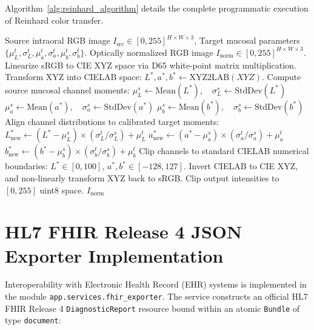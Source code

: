 \documentclass[12pt,a4paper,oneside]{report}
\begin{document}
Algorithm~\ref{alg:reinhard_algorithm} details the complete programmatic execution of Reinhard color transfer.

\begin{algorithm}[H]
\caption{Reinhard CIELAB Oral Mucosal Color Normalization}
\label{alg:reinhard_algorithm}
\begin{algorithmic}[1]
\Require Source intraoral RGB image $I_{\text{src}} \in [0, 255]^{H \times W \times 3}$, Target mucosal parameters $\{\mu_L^t, \sigma_L^t, \mu_a^t, \sigma_a^t, \mu_b^t, \sigma_b^t\}$.
\Ensure Optically normalized RGB image $I_{\text{norm}} \in [0, 255]^{H \times W \times 3}$.
\State Linearize sRGB to CIE XYZ space via D65 white-point matrix multiplication.
\State Transform XYZ into CIELAB space: $L^*, a^*, b^* \gets \text{XYZ2LAB}(XYZ)$.
\State Compute source mucosal channel moments:
    \State $\mu_L^s \gets \text{Mean}(L^*), \quad \sigma_L^s \gets \text{StdDev}(L^*)$
    \State $\mu_a^s \gets \text{Mean}(a^*), \quad \sigma_a^s \gets \text{StdDev}(a^*)$
    \State $\mu_b^s \gets \text{Mean}(b^*), \quad \sigma_b^s \gets \text{StdDev}(b^*)$
\State Align channel distributions to calibrated target moments:
    \State $L^*_{\text{new}} \gets (L^* - \mu_L^s) \times (\sigma_L^t / \sigma_L^s) + \mu_L^t$
    \State $a^*_{\text{new}} \gets (a^* - \mu_a^s) \times (\sigma_a^t / \sigma_a^s) + \mu_a^t$
    \State $b^*_{\text{new}} \gets (b^* - \mu_b^s) \times (\sigma_b^t / \sigma_b^s) + \mu_b^t$
\State Clip channels to standard CIELAB numerical boundaries: $L^* \in [0, 100]$, $a^*, b^* \in [-128, 127]$.
\State Invert CIELAB to CIE XYZ, and non-linearly transform XYZ back to sRGB.
\State Clip output intensities to $[0, 255]$ uint8 space.
\State \Return $I_{\text{norm}}$
\end{algorithmic}
\end{algorithm}

\section{HL7 FHIR Release 4 JSON Exporter Implementation}
\label{sec:fhir_impl}

Interoperability with Electronic Health Record (EHR) systems is implemented in the module \texttt{app.services.fhir\_exporter}. The service constructs an official HL7 FHIR Release 4 \texttt{DiagnosticReport} resource bound within an atomic \texttt{Bundle} of type \texttt{document}:
\end{document}
